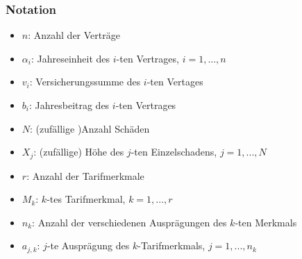 \documentclass[12pt]{report}
\theoremstyle{dotless}
\theoremstyle{definition}
\begin{document}
\subsubsection{Notation}
\begin{itemize}
\item $n$: Anzahl der Verträge
\item $\alpha_i$: Jahreseinheit des $i$-ten Vertrages, $i=1,...,n$
\item $v_i$: Versicherungssumme des $i$-ten Vertages
\item $b_i$: Jahresbeitrag des $i$-ten Vertrages
\item $N$: (zufällige )Anzahl Schäden
\item $X_j$: (zufällige) Höhe des $j$-ten Einzelschadens, $j=1,...,N$
\item $r$: Anzahl der Tarifmerkmale
\item $M_k$: $k$-tes Tarifmerkmal, $k=1,...,r$
\item $n_k$: Anzahl der verschiedenen Ausprägungen des $k$-ten Merkmals
\item $a_{j,k}$: $j$-te Ausprägung des $k$-Tarifmerkmals, $j=1,..., n_k$
\end{itemize}
\end{document}

